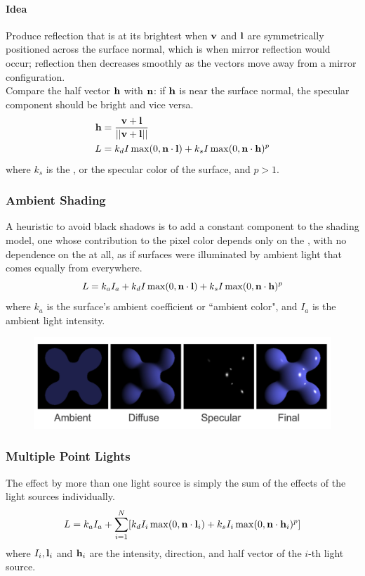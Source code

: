 \documentclass[11pt]{article}
\numberwithin{equation}{section}
\begin{document}
\paragraph{Idea}
Produce reflection that is at its brightest when $\textbf{v}$ and $\textbf{l}$ are symmetrically positioned across the surface normal, which is when mirror reflection would occur; reflection then decreases smoothly as the vectors move away from a mirror configuration.\\
Compare the half vector $\textbf{h}$ with $\textbf{n}$: if $\textbf{h}$ is near the surface normal, the specular component should be bright and vice versa.
\begin{align*}
	\textbf{h} &= \frac{\textbf{v} + \textbf{l}}{\vert \vert {\textbf{v}+ \textbf{l}} \vert \vert} \\
	L &= k_d I \max(0, \textbf{n} \cdot \textbf{l}) + k_s I \max(0, \textbf{n} \cdot \textbf{h})^p
\end{align*}
where $k_s$ is the , or the specular color of the surface, and $p > 1$.

\subsubsection{Ambient Shading}
A heuristic to avoid black shadows is to add a constant component to the shading model, one whose contribution to the pixel color depends only on the , with no dependence on the  at all, as if surfaces were illuminated by ambient light that comes equally from everywhere.
$$L = k_a I_a + k_d I \max (0, \textbf{n} \cdot \textbf{l}) + k_s I \max (0, \textbf{n} \cdot \textbf{h})^p$$
where $k_a$ is the surface's ambient coefficient or ``ambient color", and $I_a$ is the ambient light intensity.

\begin{figure}[H]
	\centering
	\includegraphics[scale=0.4]{p4}
\end{figure}


\subsubsection{Multiple Point Lights}
\property[superposition]
The effect by more than one light source is simply the sum of the effects of the light sources individually.
$$L = k_a I_a + \sum_{i=1}^N[k_dI_i\max(0, \textbf{n} \cdot \textbf{l}_i) + k_sI_i \max(0, \textbf{n} \cdot \textbf{h}_i)^p]$$
where $I_i, \textbf{l}_i$ and $\textbf{h}_i$ are the intensity, direction, and half vector of the $i$-th light source.
\end{document}
